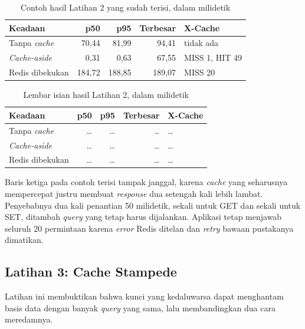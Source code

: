 \begin{table}[!htb]
  \centering
  \caption{Contoh hasil Latihan 2 yang sudah terisi, dalam milidetik}
  \label{tab:c4-lat2-contoh}
  \begin{tabularx}{\textwidth}{Xrrrl}
    \hline
    \textbf{Keadaan} & \textbf{p50} & \textbf{p95} & \textbf{Terbesar} & \textbf{X-Cache} \\
    \hline
    Tanpa \textit{cache} & 70,44 & 81,99 & 94,41 & tidak ada \\
    \hline
    \textit{Cache-aside} & 0,31 & 0,63 & 67,55 & MISS 1, HIT 49 \\
    \hline
    Redis dibekukan & 184,72 & 188,85 & 189,07 & MISS 20 \\
    \hline
  \end{tabularx}
\end{table}

\begin{table}[!htb]
  \centering
  \caption{Lembar isian hasil Latihan 2, dalam milidetik}
  \label{tab:c4-lat2-hasil}
  \begin{tabularx}{\textwidth}{Xrrrl}
    \hline
    \textbf{Keadaan} & \textbf{p50} & \textbf{p95} & \textbf{Terbesar} & \textbf{X-Cache} \\
    \hline
    Tanpa \textit{cache} & \dots & \dots & \dots & \dots \\
    \hline
    \textit{Cache-aside} & \dots & \dots & \dots & \dots \\
    \hline
    Redis dibekukan & \dots & \dots & \dots & \dots \\
    \hline
  \end{tabularx}
\end{table}

Baris ketiga pada contoh terisi tampak janggal, karena \textit{cache} yang
seharusnya mempercepat justru membuat \textit{response} dua setengah kali lebih lambat.
Penyebabnya dua kali penantian 50 milidetik, sekali untuk GET dan sekali untuk
SET, ditambah \textit{query} yang tetap harus dijalankan. Aplikasi tetap menjawab
seluruh 20 permintaan karena \textit{error} Redis ditelan dan \textit{retry} bawaan
pustakanya dimatikan.

\subsection*{Latihan 3: Cache Stampede}

Latihan ini membuktikan bahwa kunci yang kedaluwarsa dapat menghantam basis
data dengan banyak \textit{query} yang sama, lalu membandingkan dua cara meredamnya.

